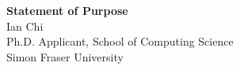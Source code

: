 \documentclass[11pt]{article}
\begin{document}
\begin{center}
    {\Large \textbf{Statement of Purpose}}\\[4pt]
    {\large Ian Chi}\\[2pt]
    Ph.D. Applicant, School of Computing Science\\
    Simon Fraser University
\end{center}

\vspace{1em}

\end{document}
